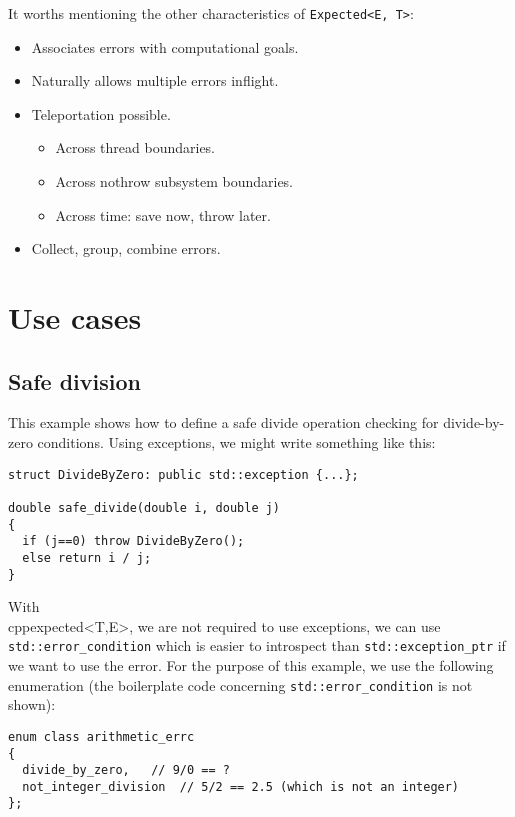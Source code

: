 \documentclass[a4paper,10pt]{article}
\newcommand{\cpp}[1]{\lstinline{#1}}
\begin{document}
\noindent
It worths mentioning the other characteristics of \cpp{Expected<E, T>}:

\begin{itemize}
 \item Associates errors with computational goals.
 \item Naturally allows multiple errors inflight.
 \item Teleportation possible.
 \begin{itemize}
  \item Across thread boundaries.
  \item Across nothrow subsystem boundaries.
  \item Across time: save now, throw later.
 \end{itemize}
 \item Collect, group, combine errors.
\end{itemize}

\section{Use cases}

\subsection{Safe division}
\label{divide-example}

This example shows how to define a safe divide operation checking for divide-by-zero conditions. Using exceptions, we might write something like this:

\begin{lstlisting}
struct DivideByZero: public std::exception {...};

double safe_divide(double i, double j)
{
  if (j==0) throw DivideByZero();
  else return i / j;
}
\end{lstlisting}

With \\cpp{expected<T,E>}, we are not required to use exceptions, we can use \cpp{std::error_condition} which is easier to introspect than \cpp{std::exception_ptr} if we want to use the error. For the purpose of this example, we use the following enumeration (the boilerplate code concerning \cpp{std::error_condition} is not shown):

\begin{lstlisting}
enum class arithmetic_errc
{
  divide_by_zero,   // 9/0 == ?
  not_integer_division  // 5/2 == 2.5 (which is not an integer)
};
\end{lstlisting}
\end{document}
